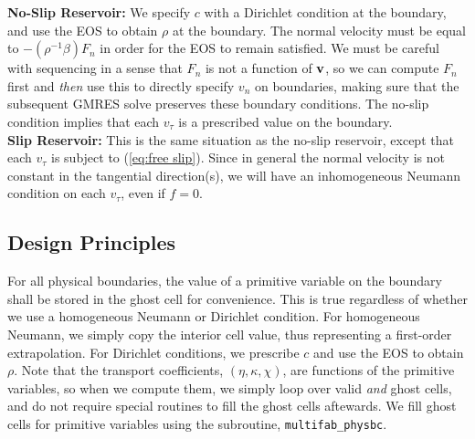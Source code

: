 \documentclass[final]{siamltex}
\def\vb {{\bf v}}
\begin{document}
{\bf No-Slip Reservoir:} We specify $c$ with a Dirichlet condition at the boundary, 
and use the EOS to obtain $\rho$ at the
boundary.  The normal velocity must be equal to $-(\rho^{-1}\beta)F_n$ in order for
the EOS to remain satisfied.  We must be careful with sequencing in a sense that
$F_n$ is not a function of $\vb$, so we can compute $F_n$ first and {\it then}
use this to directly specify $v_n$ on boundaries, making sure that the
subsequent GMRES solve preserves these boundary conditions.
The no-slip condition implies that each $v_{\tau}$ is
a prescribed value on the boundary.\\

{\bf Slip Reservoir:} This is the same situation as the no-slip reservoir, except
that each $v_{\tau}$ is subject to (\ref{eq:free slip}).  Since in general
the normal velocity is not constant in the tangential direction(s), we will have 
an inhomogeneous Neumann condition on each $v_{\tau}$, even if $f=0$.

\subsection{Design Principles}
For all physical boundaries, the value of a primitive
variable on the boundary shall be stored in the ghost cell for convenience.  This
is true regardless of whether we use a homogeneous Neumann or Dirichlet condition.
For homogeneous Neumann, we simply copy the interior cell value, thus representing
a first-order extrapolation.  For Dirichlet conditions, we prescribe $c$ and use
the EOS to obtain $\rho$.  Note that the transport coefficients, $(\eta,\kappa,\chi)$,
are functions of the primitive variables, so when we compute them, we simply loop
over valid {\it and} ghost cells, and do not require special routines to fill
the ghost cells aftewards.  We fill ghost cells for primitive variables using the
subroutine, {\tt multifab\_physbc}.\\
\end{document}
